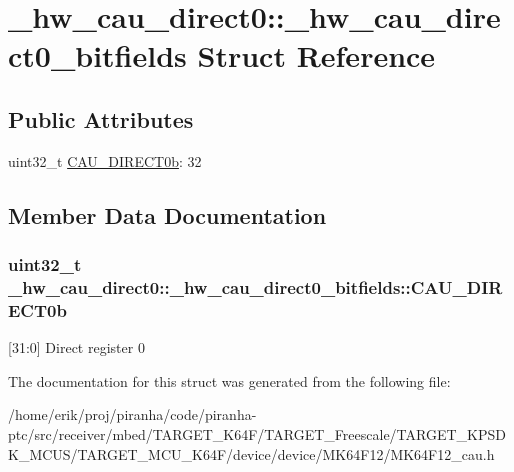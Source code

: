 \hypertarget{struct__hw__cau__direct0_1_1__hw__cau__direct0__bitfields}{}\section{\+\_\+hw\+\_\+cau\+\_\+direct0\+:\+:\+\_\+hw\+\_\+cau\+\_\+direct0\+\_\+bitfields Struct Reference}
\label{struct__hw__cau__direct0_1_1__hw__cau__direct0__bitfields}
\subsection*{Public Attributes}
\begin{DoxyCompactItemize}
\item 
uint32\+\_\+t \hyperlink{struct__hw__cau__direct0_1_1__hw__cau__direct0__bitfields_a27adf12dcbddc7690ef22e422d38a416}{C\+A\+U\+\_\+\+D\+I\+R\+E\+C\+T0b}\+: 32
\end{DoxyCompactItemize}


\subsection{Member Data Documentation}
\subsubsection[{\texorpdfstring{C\+A\+U\+\_\+\+D\+I\+R\+E\+C\+T0b}{CAU_DIRECT0b}}]{\setlength{\rightskip}{0pt plus 5cm}uint32\+\_\+t \+\_\+hw\+\_\+cau\+\_\+direct0\+::\+\_\+hw\+\_\+cau\+\_\+direct0\+\_\+bitfields\+::\+C\+A\+U\+\_\+\+D\+I\+R\+E\+C\+T0b}\hypertarget{struct__hw__cau__direct0_1_1__hw__cau__direct0__bitfields_a27adf12dcbddc7690ef22e422d38a416}{}\label{struct__hw__cau__direct0_1_1__hw__cau__direct0__bitfields_a27adf12dcbddc7690ef22e422d38a416}
\mbox{[}31\+:0\mbox{]} Direct register 0 

The documentation for this struct was generated from the following file\+:\begin{DoxyCompactItemize}
\item 
/home/erik/proj/piranha/code/piranha-\/ptc/src/receiver/mbed/\+T\+A\+R\+G\+E\+T\+\_\+\+K64\+F/\+T\+A\+R\+G\+E\+T\+\_\+\+Freescale/\+T\+A\+R\+G\+E\+T\+\_\+\+K\+P\+S\+D\+K\+\_\+\+M\+C\+U\+S/\+T\+A\+R\+G\+E\+T\+\_\+\+M\+C\+U\+\_\+\+K64\+F/device/device/\+M\+K64\+F12/M\+K64\+F12\+\_\+cau.\+h\end{DoxyCompactItemize}
